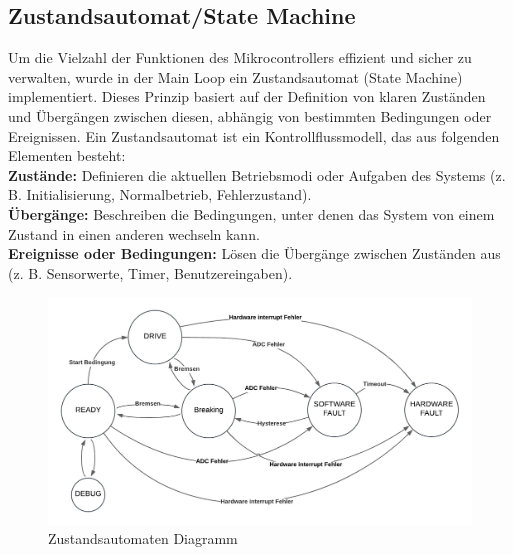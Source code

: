 \documentclass[paper=a4,11pt]{scrreprt}
\begin{document}
\subsection{Zustandsautomat/State Machine}
Um die Vielzahl der Funktionen des Mikrocontrollers effizient und sicher zu verwalten, wurde in der Main Loop ein Zustandsautomat (State Machine) implementiert. Dieses Prinzip basiert auf der Definition von klaren Zuständen und Übergängen zwischen diesen, abhängig von bestimmten Bedingungen oder Ereignissen. Ein Zustandsautomat ist ein Kontrollflussmodell, das aus folgenden Elementen besteht:\\
\textbf{Zustände:} Definieren die aktuellen Betriebsmodi oder Aufgaben des Systems (z. B. Initialisierung, Normalbetrieb, Fehlerzustand).\\
\textbf{Übergänge:} Beschreiben die Bedingungen, unter denen das System von einem Zustand in einen anderen wechseln kann.\\
\textbf{Ereignisse oder Bedingungen:} Lösen die Übergänge zwischen Zuständen aus (z. B. Sensorwerte, Timer, Benutzereingaben).\\

\begin{figure}[ht]
\begin{center}
\includegraphics[width=16cm]{Bilder/AtomatenDiagramm.PNG}
\caption{Zustandsautomaten Diagramm}
\label{StateM}
\end{center}
\end{figure}
\newpage
\end{document}
